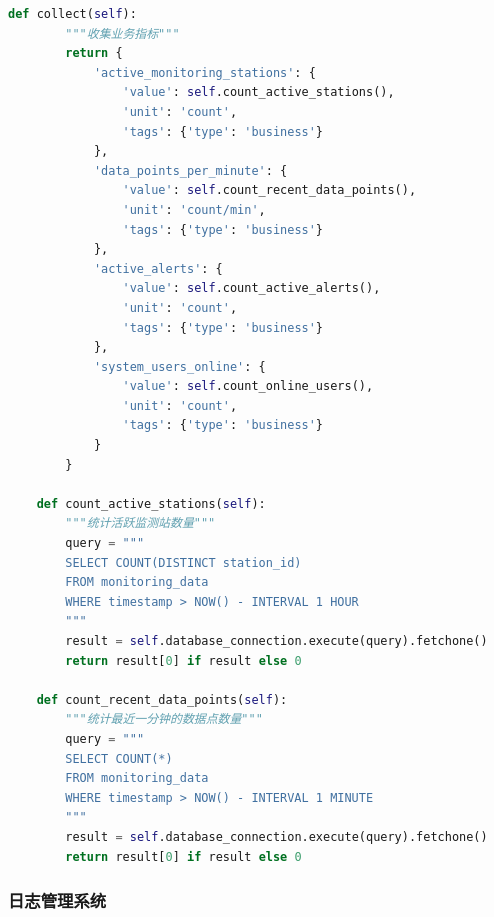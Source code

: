 \begin{lstlisting}[language=Python]
    def collect(self):
        """收集业务指标"""
        return {
            'active_monitoring_stations': {
                'value': self.count_active_stations(),
                'unit': 'count',
                'tags': {'type': 'business'}
            },
            'data_points_per_minute': {
                'value': self.count_recent_data_points(),
                'unit': 'count/min',
                'tags': {'type': 'business'}
            },
            'active_alerts': {
                'value': self.count_active_alerts(),
                'unit': 'count',
                'tags': {'type': 'business'}
            },
            'system_users_online': {
                'value': self.count_online_users(),
                'unit': 'count',
                'tags': {'type': 'business'}
            }
        }
    
    def count_active_stations(self):
        """统计活跃监测站数量"""
        query = """
        SELECT COUNT(DISTINCT station_id) 
        FROM monitoring_data 
        WHERE timestamp > NOW() - INTERVAL 1 HOUR
        """
        result = self.database_connection.execute(query).fetchone()
        return result[0] if result else 0
    
    def count_recent_data_points(self):
        """统计最近一分钟的数据点数量"""
        query = """
        SELECT COUNT(*) 
        FROM monitoring_data 
        WHERE timestamp > NOW() - INTERVAL 1 MINUTE
        """
        result = self.database_connection.execute(query).fetchone()
        return result[0] if result else 0
\end{lstlisting}

\subsubsection{日志管理系统}\label{ux65e5ux5fd7ux7ba1ux7406ux7cfbux7edf}

